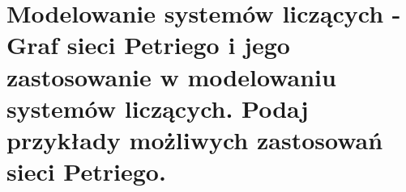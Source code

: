 \section{Modelowanie systemów liczących - Graf sieci Petriego i jego zastosowanie w modelowaniu systemów liczących. Podaj przykłady możliwych zastosowań sieci Petriego. }